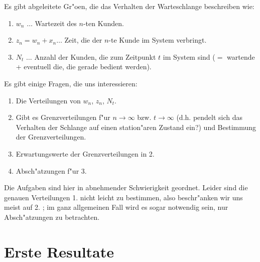 Es gibt abgeleitete Gr"o\3en, die das Verhalten der Warteschlange
beschreiben wie:
\begin{enumerate}
\item $w_{n}$ $\dots$ Wartezeit des $n$-ten Kunden.
\item $z_{n} = w_{n} + x_{n} \dots$ Zeit, die der $n$-te Kunde im System
verbringt. 
\item $N_{t}$ $\dots$ Anzahl der Kunden, die zum Zeitpunkt $t$ im System
sind ($=$ wartende + eventuell die, die gerade bedient werden).
\end{enumerate}
Es gibt einige Fragen, die uns interessieren:
\begin{enumerate}
\item Die Verteilungen von $w_{n}$, $z_{n}$, $N_{t}$.
\item Gibt es Grenzverteilungen f"ur $n \rightarrow \infty$ bzw. $t
\rightarrow \infty$ (d.h. pendelt sich das Verhalten der Schlange auf
einen station"aren Zustand ein?) und Bestimmung der Grenzverteilungen.
\item Erwartungswerte der Grenzverteilungen in 2.
\item Absch"atzungen f"ur 3.
\end{enumerate}
Die Aufgaben sind hier in abnehmender Schwierigkeit geordnet. Leider sind
die genauen Verteilungen 1. nicht leicht zu bestimmen, also beschr"anken
wir uns meist auf 2. ; im ganz allgemeinen Fall wird es sogar notwendig
sein, nur Absch"atzungen zu betrachten. 
\chapter{Erste Resultate}
